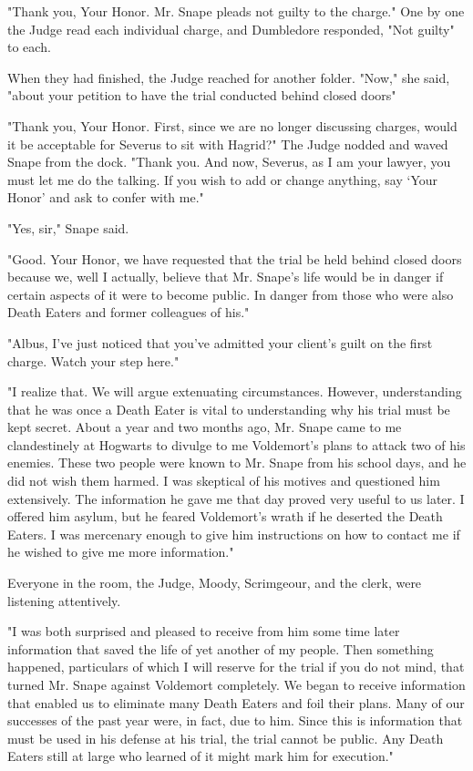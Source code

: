"Thank you, Your Honor. Mr. Snape pleads not guilty to the charge." One by one the Judge read each individual charge, and Dumbledore responded, "Not guilty" to each.

When they had finished, the Judge reached for another folder. "Now," she said, "about your petition to have the trial conducted behind closed doors{\el}"

"Thank you, Your Honor. First, since we are no longer discussing charges, would it be acceptable for Severus to sit with Hagrid?" The Judge nodded and waved Snape from the dock. "Thank you. And now, Severus, as I am your lawyer, you must let me do the talking. If you wish to add or change anything, say `Your Honor' and ask to confer with me."

"Yes, sir," Snape said.

"Good. Your Honor, we have requested that the trial be held behind closed doors because we, well I actually, believe that Mr. Snape's life would be in danger if certain aspects of it were to become public. In danger from those who were also Death Eaters and former colleagues of his."

"Albus, I've just noticed that you've admitted your client's guilt on the first charge. Watch your step here."

"I realize that. We will argue extenuating circumstances. However, understanding that he was once a Death Eater is vital to understanding why his trial must be kept secret. About a year and two months ago, Mr. Snape came to me clandestinely at Hogwarts to divulge to me Voldemort's plans to attack two of his enemies. These two people were known to Mr. Snape from his school days, and he did not wish them harmed. I was skeptical of his motives and questioned him extensively. The information he gave me that day proved very useful to us later. I offered him asylum, but he feared Voldemort's wrath if he deserted the Death Eaters. I was mercenary enough to give him instructions on how to contact me if he wished to give me more information."

Everyone in the room, the Judge, Moody, Scrimgeour, and the clerk, were listening attentively.

"I was both surprised and pleased to receive from him some time later information that saved the life of yet another of my people. Then something happened, particulars of which I will reserve for the trial if you do not mind, that turned Mr. Snape against Voldemort completely. We began to receive information that enabled us to eliminate many Death Eaters and foil their plans. Many of our successes of the past year were, in fact, due to him. Since this is information that must be used in his defense at his trial, the trial cannot be public. Any Death Eaters still at large who learned of it might mark him for execution."

